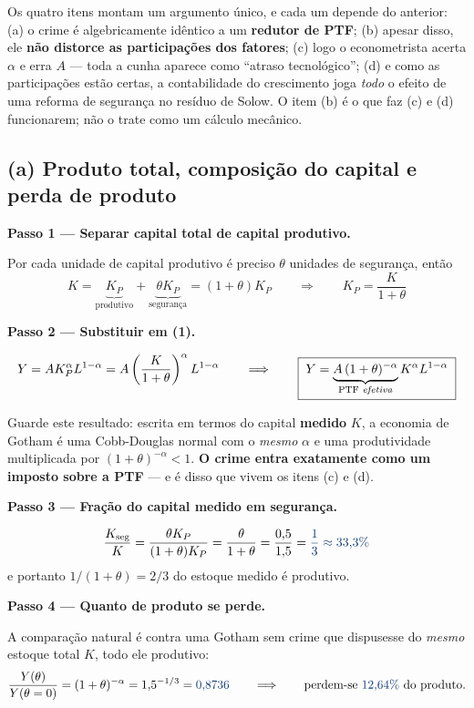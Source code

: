 \documentclass[11pt, a4paper]{article}
\newcommand{\passo}[1]{\medskip\noindent\textbf{#1}\par\nobreak}
\newcommand{\resp}[1]{%
  \ifmmode {\color{darkblue}#1}\else\textcolor{darkblue}{\textbf{#1}}\fi}
\begin{document}
\begin{tcolorbox}[theorybox, title={O arco da questão --- vale ler antes de começar}]
\small
Os quatro itens montam um argumento único, e cada um depende do anterior:
(a) o crime é algebricamente idêntico a um \textbf{redutor de PTF};
(b) apesar disso, ele \textbf{não distorce as participações dos fatores};
(c) logo o econometrista acerta $\alpha$ e erra $A$ --- toda a cunha aparece como
``atraso tecnológico'';
(d) e como as participações estão certas, a contabilidade do crescimento joga
\emph{todo} o efeito de uma reforma de segurança no resíduo de Solow.
O item (b) é o que faz (c) e (d) funcionarem; não o trate como um cálculo mecânico.
\end{tcolorbox}

\subsection*{(a) Produto total, composição do capital e perda de produto}

\passo{Passo 1 --- Separar capital total de capital produtivo.} Por cada unidade de capital
produtivo é preciso $\theta$ unidades de segurança, então
$$K = \underbrace{K_P}_{\text{produtivo}} + \underbrace{\theta K_P}_{\text{segurança}}
= (1+\theta)K_P
\qquad\Longrightarrow\qquad K_P = \frac{K}{1+\theta}$$

\passo{Passo 2 --- Substituir em (1).}
$$Y = A K_P^{\alpha}L^{1-\alpha}
= A\left(\frac{K}{1+\theta}\right)^{\alpha} L^{1-\alpha}
\qquad\Longrightarrow\qquad
\boxed{\;Y = \underbrace{A\,(1+\theta)^{-\alpha}}_{\text{PTF \emph{efetiva}}}
K^{\alpha}L^{1-\alpha}\;}$$

Guarde este resultado: escrita em termos do capital \textbf{medido} $K$, a economia de
Gotham é uma Cobb-Douglas normal com o \emph{mesmo} $\alpha$ e uma produtividade
multiplicada por $(1+\theta)^{-\alpha} < 1$. \textbf{O crime entra exatamente como um
imposto sobre a PTF} --- e é disso que vivem os itens (c) e (d).

\passo{Passo 3 --- Fração do capital medido em segurança.}
$$\frac{K_{\text{seg}}}{K} = \frac{\theta K_P}{(1+\theta)K_P}
= \frac{\theta}{1+\theta} = \frac{0{,}5}{1{,}5} = \resp{\frac13 \approx 33{,}3\%}$$
e portanto $1/(1+\theta) = 2/3$ do estoque medido é produtivo.

\passo{Passo 4 --- Quanto de produto se perde.} A comparação natural é contra uma Gotham
sem crime que dispusesse do \emph{mesmo} estoque total $K$, todo ele produtivo:
$$\frac{Y(\theta)}{Y(\theta=0)} = (1+\theta)^{-\alpha} = 1{,}5^{-1/3}
= \resp{0{,}8736}
\qquad\Longrightarrow\qquad \text{perdem-se } \resp{12{,}64\%} \text{ do produto.}$$
\end{document}
